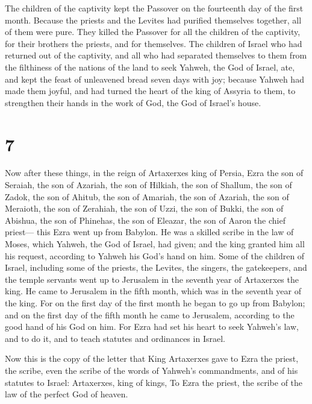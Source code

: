  The children of the captivity kept the Passover on the
fourteenth day of the first month.  Because the priests and
the Levites had purified themselves together, all of them were pure.
They killed the Passover for all the children of the captivity, for
their brothers the priests, and for themselves.  The
children of Israel who had returned out of the captivity, and all who
had separated themselves to them from the filthiness of the nations of
the land to seek Yahweh, the God of Israel, ate,  and kept
the feast of unleavened bread seven days with joy; because Yahweh had
made them joyful, and had turned the heart of the king of Assyria to
them, to strengthen their hands in the work of God, the God of Israel's
house.

\hypertarget{section-6}{%
\section{7}\label{section-6}}

 Now after these things, in the reign of Artaxerxes king of
Persia, Ezra the son of Seraiah, the son of Azariah, the son of Hilkiah,
 the son of Shallum, the son of Zadok, the son of Ahitub,
 the son of Amariah, the son of Azariah, the son of
Meraioth,  the son of Zerahiah, the son of Uzzi, the son of
Bukki,  the son of Abishua, the son of Phinehas, the son of
Eleazar, the son of Aaron the chief priest---  this Ezra
went up from Babylon. He was a skilled scribe in the law of Moses, which
Yahweh, the God of Israel, had given; and the king granted him all his
request, according to Yahweh his God's hand on him.  Some of
the children of Israel, including some of the priests, the Levites, the
singers, the gatekeepers, and the temple servants went up to Jerusalem
in the seventh year of Artaxerxes the king.  He came to
Jerusalem in the fifth month, which was in the seventh year of the king.
 For on the first day of the first month he began to go up
from Babylon; and on the first day of the fifth month he came to
Jerusalem, according to the good hand of his God on him. 
For Ezra had set his heart to seek Yahweh's law, and to do it, and to
teach statutes and ordinances in Israel.

 Now this is the copy of the letter that King Artaxerxes
gave to Ezra the priest, the scribe, even the scribe of the words of
Yahweh's commandments, and of his statutes to Israel: 
Artaxerxes, king of kings, To Ezra the priest, the scribe of the law of
the perfect God of heaven.

